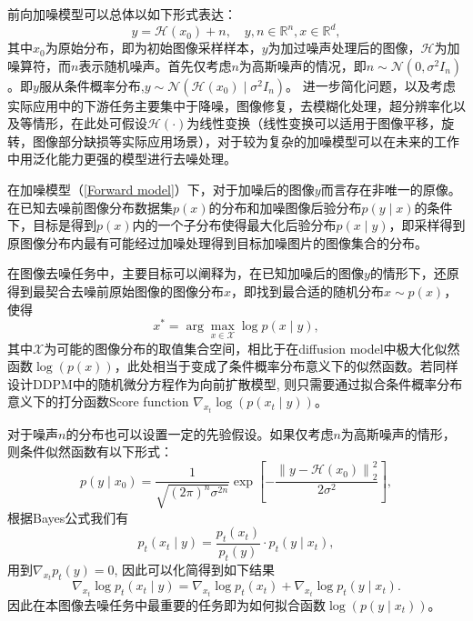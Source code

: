 前向加噪模型可以总体以如下形式表达：
\begin{equation}
y=\mathcal{H}\left(x_0\right)+{n}, \quad y, {n} \in \mathbb{R}^n, x \in \mathbb{R}^d,
\label{Forward model}
\end{equation}
其中$x_0$为原始分布，即为初始图像采样样本，$y$为加过噪声处理后的图像，$\mathcal{H}$为加噪算符，而$n$表示随机噪声。首先仅考虑$n$为高斯噪声的情况，即$n\sim \mathcal{N}(0,\sigma^2 I_n)$。即$y$服从条件概率分布,$y\sim \mathcal{N}(\mathcal{H}(x_0)\mid \sigma^2 I_n)$。
进一步简化问题，以及考虑实际应用中的下游任务主要集中于降噪，图像修复，去模糊化处理，超分辨率化以及等情形，在此处可假设$\mathcal{H}(\cdot)$为线性变换（线性变换可以适用于图像平移，旋转，图像部分缺损等实际应用场景），对于较为复杂的加噪模型可以在未来的工作中用泛化能力更强的模型进行去噪处理。      
\begin{definition}[图像去噪]
在加噪模型（\ref{Forward model}）下，对于加噪后的图像$y$而言存在非唯一的原像。在已知去噪前图像分布数据集$p(x)$的分布和加噪图像后验分布$p(y\mid x)$的条件下，目标是得到$p(x)$内的一个子分布使得最大化后验分布$p(x\mid y)$，即采样得到原图像分布内最有可能经过加噪处理得到目标加噪图片的图像集合的分布。
\end{definition}

在图像去噪任务中，主要目标可以阐释为，在已知加噪后的图像$y$的情形下，还原得到最契合去噪前原始图像的图像分布$x$，即找到最合适的随机分布$x\sim p(x)$，使得
\begin{equation}
    x^{*} = \arg \max_{x\in \mathcal{X}}\log p( x\mid y),
\end{equation}
其中$\mathcal{X}$为可能的图像分布的取值集合空间，相比于在diffusion model中极大化似然函数$\log(p(x))$，此处相当于变成了条件概率分布意义下的似然函数。若同样设计DDPM中的随机微分方程作为向前扩散模型, 则只需要通过拟合条件概率分布意义下的打分函数Score function $\nabla_{x_t}\log\left(p(x_t\mid y)\right)$。   






对于噪声$n$的分布也可以设置一定的先验假设。如果仅考虑$n$为高斯噪声的情形，则条件似然函数有以下形式：
\begin{equation}
 p\left(y \mid x_0\right)=\frac{1}{\sqrt{(2 \pi)^n \sigma^{2 n}}} \exp \left[-\frac{\left\|y-\mathcal{H}\left(x_0\right)\right\|_2^2}{2 \sigma^2}\right],
 \label{log-likelihood gaussion }
\end{equation}
根据Bayes公式我们有
\begin{equation}
    p_t(x_t\mid y) = \frac{p_t(x_t)}{p_t(y)}\cdot p_t(y\mid x_t),
\end{equation}
用到$\nabla_{x_t}p_t(y)=0$, 因此可以化简得到如下结果
\begin{equation}
\nabla_{x_t} \log p_t\left(x_t \mid y\right)=\nabla_{x_t} \log p_t\left(x_t\right)+\nabla_{x_t} \log p_t\left(y \mid x_t\right).
\label{conditional score function }
\end{equation}
因此在本图像去噪任务中最重要的任务即为如何拟合函数$\log \left(p(y\mid x_t)\right)$。

